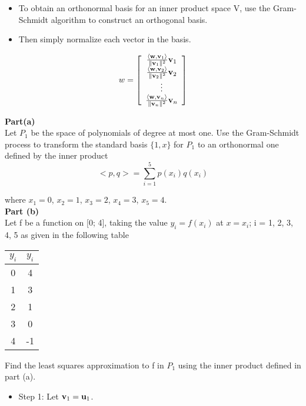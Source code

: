 \documentclass[12pt, a4paper]{report}
\theoremstyle{plain}
\theoremstyle{definition}
\theoremstyle{remark}
\begin{document}
\newpage
{\large




\newpage
{ \Large
\begin{itemize}
\item To obtain an orthonormal basis for an inner product space V, use the Gram-Schmidt algorithm to construct an orthogonal basis. \item Then simply normalize each vector in the basis.
\end{itemize}

\[ w= \left[ \begin{array}{c}
				\frac{\langle {\bf w},{\bf v}_1\rangle}{\| {\bf v}_1 \|^{2}}{\bf v}_1\\
				\frac{\langle {\bf w},{\bf v}_2\rangle}{\| {\bf v}_2 \|^{2}}{\bf v}_2\\
				\vdots\\
				\frac{\langle {\bf w},{\bf v}_n\rangle}{\| {\bf v}_n \|^{2}}{\bf v}_n
			\end{array} \right] \]
			
}	
\newpage
{
\Large
\noindent \textbf{Part(a)} \\
Let $P_1$ be the space of polynomials of degree at most one. Use the
Gram-Schmidt process to transform the standard basis $\{1, x\}$ for $P_1$
to an orthonormal one defined by the inner product
\[ <p,q> = \sum_{i=1}^{5} p(x_i)q(x_i) \]


where $x_1 = 0$, $x_2 = 1$, $x_3 = 2$, $x_4 = 3$, $x_5 = 4$.\\
\bigskip
\textbf{Part (b)} \\
 Let f be a function on [0; 4], taking the value $y_i = f(x_i)$ at $x = x_i$; i =
1, 2, 3, 4, 5 as given in the following table
\begin{center}
\begin{tabular}{|c|c|}
\hline  $y_i$ & $y_i$  \\
\hline \hline  0 & 4  \\
\hline  1 & 3  \\
\hline  2 & 1  \\
\hline  3 & 0  \\
\hline  4 &-1  \\
\hline
\end{tabular}
\end{center}


Find the least squares approximation to f in $P_1$ using the inner product
defined in part (a).
}
\newpage
{\Large
\begin{itemize}
\item Step 1: Let ${\bf v}_1 = {\bf u}_1$.	
			


\end{itemize}}}
\end{document}
